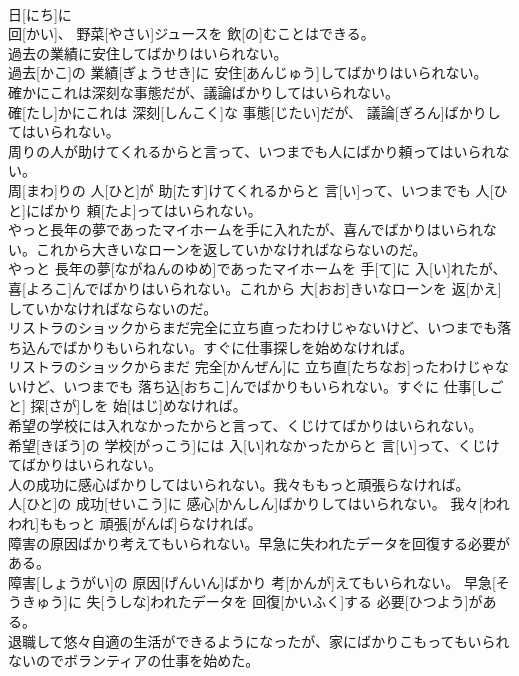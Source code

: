 \documentclass[8pt]{extreport}
\begin{document}
\begin{CJK}{UTF8}{min}
\\	日[にち]に 
\\	回[かい]、 野菜[やさい]ジュースを 飲[の]むことはできる。
\\	過去の業績に安住してばかりはいられない。	
\\	過去[かこ]の 業績[ぎょうせき]に 安住[あんじゅう]してばかりはいられない。
\\	確かにこれは深刻な事態だが、議論ばかりしてはいられない。	
\\	確[たし]かにこれは 深刻[しんこく]な 事態[じたい]だが、 議論[ぎろん]ばかりしてはいられない。
\\	周りの人が助けてくれるからと言って、いつまでも人にばかり頼ってはいられない。	
\\	周[まわ]りの 人[ひと]が 助[たす]けてくれるからと 言[い]って、いつまでも 人[ひと]にばかり 頼[たよ]ってはいられない。
\\	やっと長年の夢であったマイホームを手に入れたが、喜んでばかりはいられない。これから大きいなローンを返していかなければならないのだ。	
\\	やっと 長年の夢[ながねんのゆめ]であったマイホームを 手[て]に 入[い]れたが、 喜[よろこ]んでばかりはいられない。これから 大[おお]きいなローンを 返[かえ]していかなければならないのだ。
\\	リストラのショックからまだ完全に立ち直ったわけじゃないけど、いつまでも落ち込んでばかりもいられない。すぐに仕事探しを始めなければ。	
\\	リストラのショックからまだ 完全[かんぜん]に 立ち直[たちなお]ったわけじゃないけど、いつまでも 落ち込[おちこ]んでばかりもいられない。すぐに 仕事[しごと] 探[さが]しを 始[はじ]めなければ。
\\	希望の学校には入れなかったからと言って、くじけてばかりはいられない。	
\\	希望[きぼう]の 学校[がっこう]には 入[い]れなかったからと 言[い]って、くじけてばかりはいられない。
\\	人の成功に感心ばかりしてはいられない。我々ももっと頑張らなければ。	
\\	人[ひと]の 成功[せいこう]に 感心[かんしん]ばかりしてはいられない。 我々[われわれ]ももっと 頑張[がんば]らなければ。
\\	障害の原因ばかり考えてもいられない。早急に失われたデータを回復する必要がある。	
\\	障害[しょうがい]の 原因[げんいん]ばかり 考[かんが]えてもいられない。 早急[そうきゅう]に 失[うしな]われたデータを 回復[かいふく]する 必要[ひつよう]がある。
\\	退職して悠々自適の生活ができるようになったが、家にばかりこもってもいられないのでボランティアの仕事を始めた。	

\end{CJK}
\end{document}
